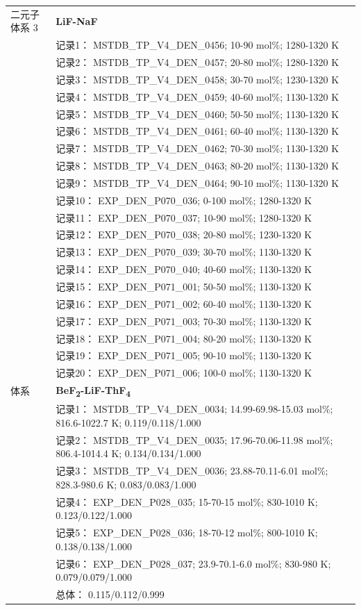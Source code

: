 \documentclass[12pt]{article}
\begin{document}
{\begin{longtable}[]{@{}
  >{\raggedright\arraybackslash}p{}
  >{\raggedright\arraybackslash}p{}@{}}
二元子体系 3  & \textbf{LiF-NaF} \\
 & 记录1： MSTDB\_TP\_V4\_DEN\_0456; 10-90 mol\%; 1280-1320 K \\
 & 记录2： MSTDB\_TP\_V4\_DEN\_0457; 20-80 mol\%; 1280-1320 K \\
 & 记录3： MSTDB\_TP\_V4\_DEN\_0458; 30-70 mol\%; 1230-1320 K \\
 & 记录4： MSTDB\_TP\_V4\_DEN\_0459; 40-60 mol\%; 1130-1320 K \\
 & 记录5： MSTDB\_TP\_V4\_DEN\_0460; 50-50 mol\%; 1130-1320 K \\
 & 记录6： MSTDB\_TP\_V4\_DEN\_0461; 60-40 mol\%; 1130-1320 K \\
 & 记录7： MSTDB\_TP\_V4\_DEN\_0462; 70-30 mol\%; 1130-1320 K \\
 & 记录8： MSTDB\_TP\_V4\_DEN\_0463; 80-20 mol\%; 1130-1320 K \\
 & 记录9： MSTDB\_TP\_V4\_DEN\_0464; 90-10 mol\%; 1130-1320 K \\
 & 记录10： EXP\_DEN\_P070\_036; 0-100 mol\%; 1280-1320 K \\
 & 记录11： EXP\_DEN\_P070\_037; 10-90 mol\%; 1280-1320 K \\
 & 记录12： EXP\_DEN\_P070\_038; 20-80 mol\%; 1230-1320 K \\
 & 记录13： EXP\_DEN\_P070\_039; 30-70 mol\%; 1130-1320 K \\
 & 记录14： EXP\_DEN\_P070\_040; 40-60 mol\%; 1130-1320 K \\
 & 记录15： EXP\_DEN\_P071\_001; 50-50 mol\%; 1130-1320 K \\
 & 记录16： EXP\_DEN\_P071\_002; 60-40 mol\%; 1130-1320 K \\
 & 记录17： EXP\_DEN\_P071\_003; 70-30 mol\%; 1130-1320 K \\
 & 记录18： EXP\_DEN\_P071\_004; 80-20 mol\%; 1130-1320 K \\
 & 记录19： EXP\_DEN\_P071\_005; 90-10 mol\%; 1130-1320 K \\
 & 记录20： EXP\_DEN\_P071\_006; 100-0 mol\%; 1130-1320 K  \\

\midrule
体系 & \textbf{BeF\textsubscript{2}-LiF-ThF\textsubscript{4}} \\
 & 记录1： MSTDB\_TP\_V4\_DEN\_0034; 14.99-69.98-15.03 mol\%; 816.6-1022.7 K; 0.119/0.118/1.000 \\
 & 记录2： MSTDB\_TP\_V4\_DEN\_0035; 17.96-70.06-11.98 mol\%; 806.4-1014.4 K; 0.134/0.134/1.000 \\
 & 记录3： MSTDB\_TP\_V4\_DEN\_0036; 23.88-70.11-6.01 mol\%; 828.3-980.6 K; 0.083/0.083/1.000 \\
 & 记录4： EXP\_DEN\_P028\_035; 15-70-15 mol\%; 830-1010 K; 0.123/0.122/1.000 \\
 & 记录5： EXP\_DEN\_P028\_036; 18-70-12 mol\%; 800-1010 K; 0.138/0.138/1.000 \\
 & 记录6： EXP\_DEN\_P028\_037; 23.9-70.1-6.0 mol\%; 830-980 K; 0.079/0.079/1.000 \\
 & 总体： 0.115/0.112/0.999  \\


\end{longtable}}
\end{document}
